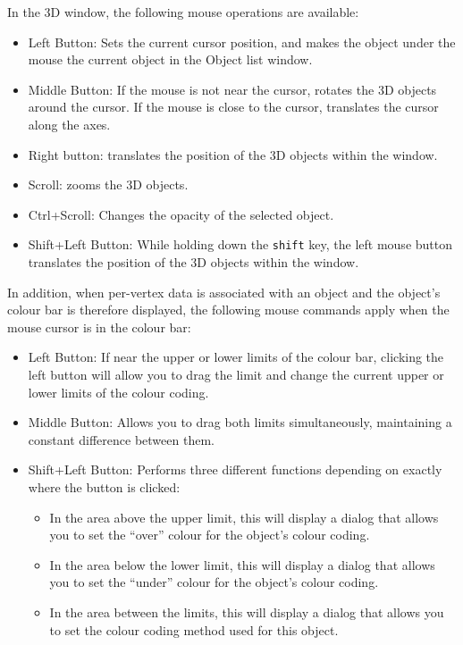 \documentclass[11pt,letterpaper]{article}
\newcommand{\ident}[1]{{\tt #1}}
\begin{document}
In the 3D window, the following mouse operations are available:

\begin{itemize}
\item Left Button: Sets the current cursor position, and makes the 
object under the mouse the current object in the Object list window.
\item Middle Button: If the mouse is not near the cursor, rotates the 3D
objects around the cursor. If the mouse is close to the cursor, translates
the cursor along the axes.
\item Right button: translates the position of the 3D objects within the
window.
\item Scroll: zooms the 3D objects.
\item Ctrl+Scroll: Changes the opacity of the selected object.
\item Shift+Left Button: While holding down the \ident{shift} key, the
 left mouse button translates the position of the 3D objects within
 the window.
\end{itemize}

In addition, when per-vertex data is associated with an object and the
object's colour bar is therefore displayed, the following mouse commands
apply when the mouse cursor is in the colour bar:
\begin{itemize}
\item Left Button: If near the upper or lower limits of the colour bar,
clicking the left button will allow you to drag the limit and change the
current upper or lower limits of the colour coding.
\item Middle Button: Allows you to drag both limits simultaneously, maintaining a 
constant difference between them.
\item Shift+Left Button: Performs three different functions depending on
exactly where the button is clicked:
\begin{itemize}
\item In the area above the upper limit,
 this will display a dialog that allows you to set the ``over'' colour
 for the object's colour coding.
\item In the area below the lower limit,
 this will display a dialog that allows you to set the ``under'' colour
 for the object's colour coding.
\item In the area between the limits, this will display a dialog that
allows you to set the colour coding method used for this object.
\end{itemize}
\end{itemize}
\end{document}

